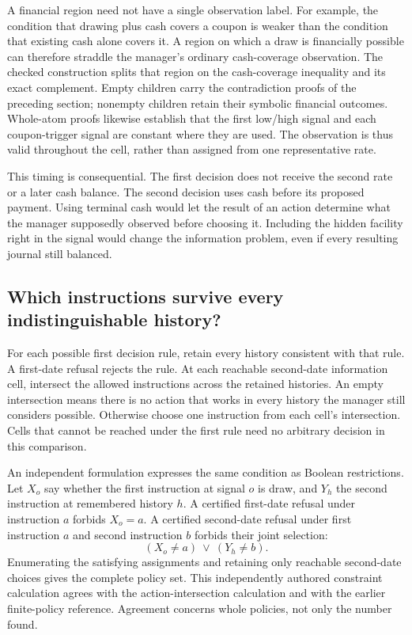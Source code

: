 A financial region need not have a single observation label. For example, the condition that drawing plus cash covers a coupon is weaker than the condition that existing cash alone covers it. A region on which a draw is financially possible can therefore straddle the manager's ordinary cash-coverage observation. The checked construction splits that region on the cash-coverage inequality and its exact complement. Empty children carry the contradiction proofs of the preceding section; nonempty children retain their symbolic financial outcomes. Whole-atom proofs likewise establish that the first low/high signal and each coupon-trigger signal are constant where they are used. The observation is thus valid throughout the cell, rather than assigned from one representative rate.

This timing is consequential. The first decision does not receive the second rate or a later cash balance. The second decision uses cash before its proposed payment. Using terminal cash would let the result of an action determine what the manager supposedly observed before choosing it. Including the hidden facility right in the signal would change the information problem, even if every resulting journal still balanced.

\subsection{Which instructions survive every indistinguishable history?}

For each possible first decision rule, retain every history consistent with that rule. A first-date refusal rejects the rule. At each reachable second-date information cell, intersect the allowed instructions across the retained histories. An empty intersection means there is no action that works in every history the manager still considers possible. Otherwise choose one instruction from each cell's intersection. Cells that cannot be reached under the first rule need no arbitrary decision in this comparison.

An independent formulation expresses the same condition as Boolean restrictions. Let $X_o$ say whether the first instruction at signal $o$ is draw, and $Y_h$ the second instruction at remembered history $h$. A certified first-date refusal under instruction $a$ forbids $X_o=a$. A certified second-date refusal under first instruction $a$ and second instruction $b$ forbids their joint selection:
\begin{equation}
 (X_o\ne a)\ \lor\ (Y_h\ne b).
\end{equation}
Enumerating the satisfying assignments and retaining only reachable second-date choices gives the complete policy set. This independently authored constraint calculation agrees with the action-intersection calculation and with the earlier finite-policy reference. Agreement concerns whole policies, not only the number found.

